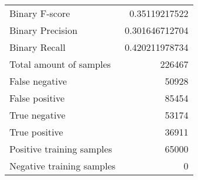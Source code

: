 \begin{table}[H]
\begin{minipage}{0.5\textwidth}
\begin{tabular}{l r}
\midrule
Binary F-score & 0.35119217522 \\
Binary Precision & 0.301646712704 \\
Binary Recall & 0.420211978734 \\
\midrule
Total amount of samples & 226467 \\
False negative & 50928 \\
False positive & 85454 \\
True negative & 53174 \\
True positive & 36911 \\
\midrule
Positive training samples & 65000 \\
Negative training samples & 0 \\
\bottomrule
\end{tabular}
\end{minipage}
\end{table}
